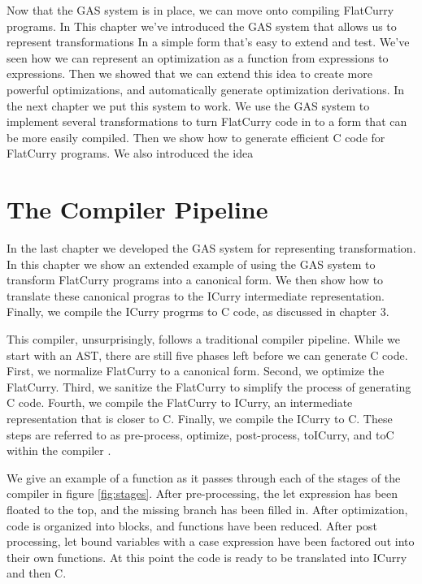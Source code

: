 \documentclass{book}
\theoremstyle{definition}
\begin{document}
Now that the GAS system is in place, we can move onto compiling FlatCurry programs.
In This chapter we've introduced the GAS system that allows us to represent transformations 
In a simple form that's easy to extend and test.
We've seen how we can represent an optimization as a function from expressions to expressions.
Then we showed that we can extend this idea to create more powerful optimizations,
and automatically generate optimization derivations.
In the next chapter we put this system to work.
We use the GAS system to implement several transformations to turn FlatCurry code
in to a form that can be more easily compiled.
Then we show how to generate efficient C code for FlatCurry programs.
We also introduced the idea

\chapter{The Compiler Pipeline} \label{ch:The Compiler Pipeline}


In the last chapter we developed the GAS system for representing transformation.
In this chapter we show an extended example of using the GAS system to transform FlatCurry programs
into a canonical form.
We then show how to translate these canonical progras to the ICurry intermediate representation.
Finally, we compile the ICurry progrms to C code, as discussed in chapter 3.

This compiler, unsurprisingly, follows a traditional compiler pipeline.
While we start with an AST, there are still five phases left before we can generate C code.
First, we normalize FlatCurry to a canonical form. 
Second, we optimize the FlatCurry. 
Third, we sanitize the FlatCurry to simplify the process of generating C code.
Fourth, we compile the FlatCurry to ICurry, an intermediate representation that is closer to C.
Finally, we compile the ICurry to C.
These steps are referred to as pre-process, optimize, post-process, toICurry, and toC within the compiler
\cite{git}.

We give an example of a function as it passes through each of the stages of the 
compiler in figure \ref{fig:stages}.
After pre-processing, the let expression has been floated to the top,
and the missing branch has been filled in.
After optimization, code is organized into blocks, and functions have been reduced.
After post processing, let bound variables with a case expression have been factored
out into their own functions.
At this point the code is ready to be translated into ICurry and then C.
\end{document}
